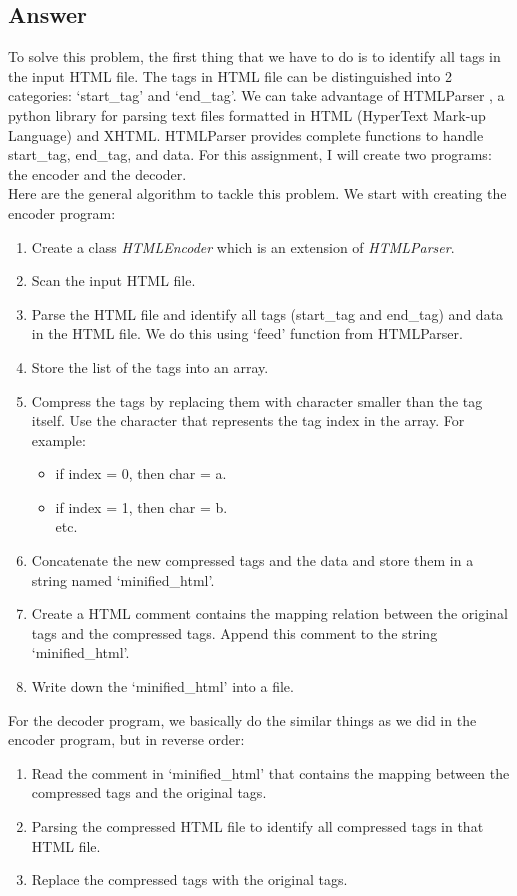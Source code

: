 \documentclass[letterpaper,11pt]{article}
\begin{document}
\subsection*{Answer}
To solve this problem, the first thing that we have to do is to identify all tags in the input HTML file. The tags in HTML file can be distinguished into 2 categories: `start\_tag' and `end\_tag'. We can take advantage of HTMLParser \cite{txt-compression}, a python library for parsing text files formatted in HTML (HyperText Mark-up Language) and XHTML. HTMLParser provides complete functions to handle start\_tag, end\_tag, and data. For this assignment, I will create two programs: the encoder and the decoder. \\
Here are the general algorithm to tackle this problem. We start with creating the encoder program: 
\begin{enumerate}
	\item Create a class \textit{HTMLEncoder} which is an extension of \textit{HTMLParser}. 
	\item Scan the input HTML file. 
	\item Parse the HTML file and identify all tags (start\_tag and end\_tag) and data in the HTML file. We do this using `feed' function from HTMLParser. 
	\item Store the list of the tags into an array. 
	\item Compress the tags by replacing them with character smaller than the tag itself. Use the character that represents the tag index in the array. For example: 
	\begin{itemize}
		\item if index = 0, then char = a.
		\item if index = 1, then char = b. \\
		etc.
	\end{itemize}
	\item Concatenate the new compressed tags and the data and store them in a string named `minified\_html'.
	\item Create a HTML comment contains the mapping relation between the original tags and the compressed tags. Append this comment to the string `minified\_html'. 
	\item Write down the `minified\_html' into a file. 
\end{enumerate}
	
For the decoder program, we basically do the similar things as we did in the encoder program, but in reverse order:
\begin{enumerate}
	\item Read the comment in `minified\_html' that contains the mapping between the compressed tags and the original tags. 
	\item Parsing the compressed HTML file to identify all compressed tags in that HTML file. 
	\item Replace the compressed tags with the original tags. 
\end{enumerate}
	
\end{document}
